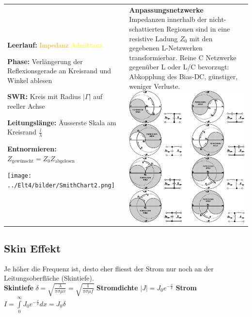 \begin{tabular}{ll}
{\begin{liste}
      \item \textbf{Leerlauf:}      \textcolor{orange}{Impedanz} \textcolor{yellow}{Admittanz}
      \item \textbf{Phase:} Verlängerung der Reflexionsgerade an Kreisrand und Winkel ablesen
      \item \textbf{SWR:} Kreis mit Radius $|\Gamma|$ auf reeller Achse
      \item \textbf{Leitungslänge:} Äusserste Skala am Kreisrand  $\frac{l}{\lambda}$
      \item \textbf{Entnormieren:} $Z_{\text{gewünscht}} = Z_0
      Z_{\text{abgelesen}}$
    \end{liste}
    \texttt{[image: ../Elt4/bilder/SmithChart2.png]}
    }
& \parbox{9cm}{
    \textbf{Anpassungsnetzwerke} \\
    \small{Impedanzen innerhalb der nicht-schattierten Regionen sind in eine
    resistive Ladung $Z_0$ mit den gegebenen L-Netzwerken transformierbar}.
    Reine C Netzwerke gegenüber L oder L/C bevorzugt: Abkopplung des
    Bias-DC, günstiger, weniger Verluste. \\
    \includegraphics[width=8.5cm]{./bilder/rfdesign_smithchart_matching_Ltypes.png}
    }
\end{tabular}

\subsection{Skin Effekt }
Je höher die Frequenz ist, desto eher fliesst der Strom nur noch an der
Leitungsoberfläche (Skintiefe). \\
\textbf{Skintiefe} $\delta = \sqrt{\frac{\lambda}{\pi\sigma\mu v}}
         = \sqrt{\frac{1}{\pi\sigma\mu f}}$ \qquad
\textbf{Stromdichte} $|J|=J_0 e^{-\frac x{\delta}}$ \qquad 
\textbf{Strom} $I = \int\limits_{0}^{\infty} J_0 e^{-\frac{x}{\delta}} dx = J_0
\delta$\\

